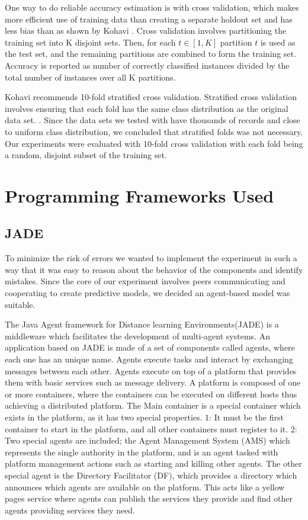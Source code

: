 One way to do reliable accuracy estimation is with cross validation, which makes more efficient use of training data than creating a separate holdout set and has less bias than as shown by Kohavi \cite{kohavi1995crossvalidation}. Cross validation involves partitioning the training set into K disjoint sets. Then, for each $t \in [1, K]$ partition $t$ is used as the test set, and the remaining partitions are combined to form the training set. Accuracy is reported as number of correctly classified instances divided by the total number of instances over all K partitions. 

Kohavi recommends 10-fold stratified cross validation. Stratified cross validation involves ensuring that each fold has the same class distribution as the original data set. . Since the data sets we tested with have thousands of records and close to uniform class distribution, we concluded that stratified folds was not necessary. Our experiments were evaluated with 10-fold cross validation with each fold being a random, disjoint subset of the training set.


\section{Programming Frameworks Used}

 \subsection{JADE}
 
To minimize the risk of errors we wanted to implement the experiment in such a way that it was easy to reason about the behavior of the components and identify mistakes. Since the core of our experiment involves peers communicating and cooperating to create predictive models, we decided an agent-based model was suitable.  
 
The Java Agent framework for Distance learning Environments(JADE) is a middleware which facilitates the development of multi-agent systems. An application based on JADE is made of a set of components called agents, where each one has an unique name. Agents execute tasks and interact by exchanging messages between each other. Agents execute on top of a platform that provides them with basic services such as message delivery. A platform is composed of one or more containers, where the containers can be executed on different hosts thus achieving a distributed platform. The Main container is a special container which exists in the platform, as it has two special properties. 1: It must be the first container to start in the platform, and all other containers must register to it. 2: Two special agents are included; the Agent Management System (AMS) which represents the single authority in the platform, and is an agent tasked with platform management actions such as starting and killing other agents. The other special agent is the Directory Facilitator (DF), which provides a directory which announces which agents are available on the platform. This acts like a yellow pages service where agents can publish the services they provide and find other agents providing services they need.

